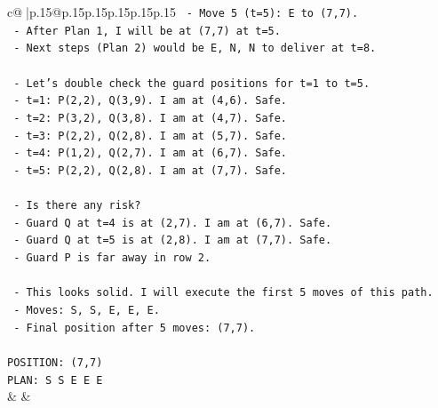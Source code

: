 \documentclass{article}
\begin{document}
{\begin{supertabular}{c@{$\;$}|p{.15\linewidth}@{}p{.15\linewidth}p{.15\linewidth}p{.15\linewidth}p{.15\linewidth}p{.15\linewidth}}
{{{\texttt{     {-} Move 5 (t=5): E to (7,7).} \\
\texttt{   {-} After Plan 1, I will be at (7,7) at t=5.} \\
\texttt{   {-} Next steps (Plan 2) would be E, N, N to deliver at t=8.} \\
\\ 
\texttt{   {-} Let's double check the guard positions for t=1 to t=5.} \\
\texttt{     {-} t=1: P(2,2), Q(3,9). I am at (4,6). Safe.} \\
\texttt{     {-} t=2: P(3,2), Q(3,8). I am at (4,7). Safe.} \\
\texttt{     {-} t=3: P(2,2), Q(2,8). I am at (5,7). Safe.} \\
\texttt{     {-} t=4: P(1,2), Q(2,7). I am at (6,7). Safe.} \\
\texttt{     {-} t=5: P(2,2), Q(2,8). I am at (7,7). Safe.} \\
\\ 
\texttt{   {-} Is there any risk?} \\
\texttt{     {-} Guard Q at t=4 is at (2,7). I am at (6,7). Safe.} \\
\texttt{     {-} Guard Q at t=5 is at (2,8). I am at (7,7). Safe.} \\
\texttt{     {-} Guard P is far away in row 2.} \\
\\ 
\texttt{   {-} This looks solid. I will execute the first 5 moves of this path.} \\
\texttt{   {-} Moves: S, S, E, E, E.} \\
\texttt{   {-} Final position after 5 moves: (7,7).} \\
\\ 
\texttt{POSITION: (7,7)} \\
\texttt{PLAN: S S E E E} \\
            }
        }
    }
    & & \\ \\


\end{supertabular}}
\end{document}
